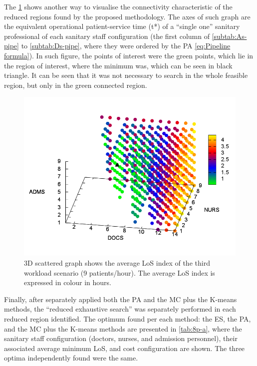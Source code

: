 The \ref{fig:3D-scattered-graph-50} shows another way to visualise
the connectivity characteristic of the reduced regions found by the
proposed methodology. The axes of such graph are the equivalent operational
patient-service time \foreignlanguage{american}{(t{*})} of a ``single
one'' sanitary professional of each sanitary staff configuration
(the first column of \ref{subtab:As-pipe} to \ref{subtab:Ds-pipe},
where they were ordered by the PA \ref{eq:Pipeline formula}). In
such figure, the points of interest were the green points, which lie
in the region of interest, where the minimum was, which can be seen
in black triangle. It can be seen that it was not necessary to search
in the whole feasible region, but only in the green connected region.
\begin{figure}[H]
\noindent \begin{centering}
\includegraphics[width=0.95\columnwidth,height=0.2\paperheight]{figs4/v0/6400-602-50-3D-scatter-LoS2}
\par\end{centering}

\caption{3D scattered graph shows the average LoS index of the third workload
scenario (9 patients/hour). The average LoS index is expressed in
colour in hours.\label{fig:3D-scattered-graph-50}}
\end{figure}


Finally, after separately applied both the PA and the MC plus the
K-means methods, the \textquotedblleft{}reduced exhaustive search\textquotedblright{}
was separately performed in each reduced region identified. The optimum
found per each method: the ES, the PA, and the MC plus the K-means
methods are presented in \ref{tab:8p-a}, where the sanitary staff
configuration (doctors, nurses, and admission personnel), their associated
average minimum LoS, and cost configuration are shown. The three optima
 independently found were the same. 

